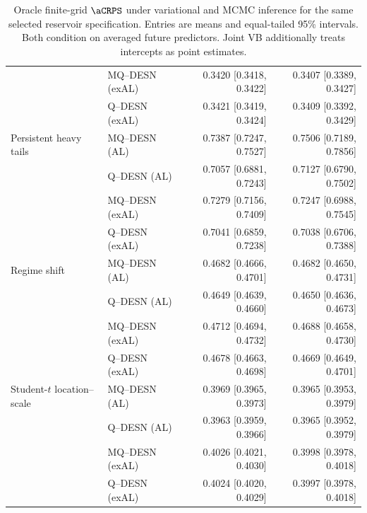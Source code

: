 \begin{table}[!htbp]
\begin{tabular}{@{}>{\raggedright\arraybackslash}p{}lrr@{}}
 & MQ--DESN (exAL) & 0.3420 [0.3418, 0.3422] & 0.3407 [0.3389, 0.3427] \\
 & Q--DESN (exAL) & 0.3421 [0.3419, 0.3424] & 0.3409 [0.3392, 0.3429] \\
\addlinespace[2pt]
Persistent heavy tails & MQ--DESN (AL) & 0.7387 [0.7247, 0.7527] & 0.7506 [0.7189, 0.7856] \\
 & Q--DESN (AL) & 0.7057 [0.6881, 0.7243] & 0.7127 [0.6790, 0.7502] \\
 & MQ--DESN (exAL) & 0.7279 [0.7156, 0.7409] & 0.7247 [0.6988, 0.7545] \\
 & Q--DESN (exAL) & 0.7041 [0.6859, 0.7238] & 0.7038 [0.6706, 0.7388] \\
\addlinespace[2pt]
Regime shift & MQ--DESN (AL) & 0.4682 [0.4666, 0.4701] & 0.4682 [0.4650, 0.4731] \\
 & Q--DESN (AL) & 0.4649 [0.4639, 0.4660] & 0.4650 [0.4636, 0.4673] \\
 & MQ--DESN (exAL) & 0.4712 [0.4694, 0.4732] & 0.4688 [0.4658, 0.4730] \\
 & Q--DESN (exAL) & 0.4678 [0.4663, 0.4698] & 0.4669 [0.4649, 0.4701] \\
\addlinespace[2pt]
Student-\(t\) location--scale & MQ--DESN (AL) & 0.3969 [0.3965, 0.3973] & 0.3965 [0.3953, 0.3979] \\
 & Q--DESN (AL) & 0.3963 [0.3959, 0.3966] & 0.3965 [0.3952, 0.3979] \\
 & MQ--DESN (exAL) & 0.4026 [0.4021, 0.4030] & 0.3998 [0.3978, 0.4018] \\
 & Q--DESN (exAL) & 0.4024 [0.4020, 0.4029] & 0.3997 [0.3978, 0.4018] \\
\bottomrule
\end{tabular}
\caption{Oracle finite-grid \(\aCRPS\) under variational and MCMC inference for the same selected reservoir specification. Entries are means and equal-tailed 95\% intervals. Both condition on averaged future predictors. Joint VB additionally treats intercepts as point estimates.}
\label{tab:joint-qdesn-corrected-v3-vb}
\end{table}
